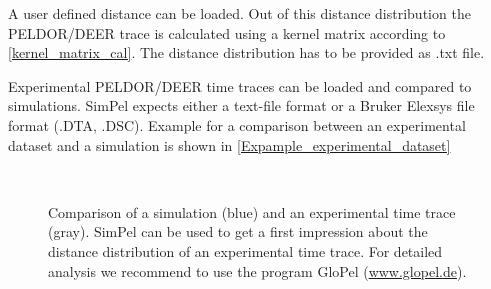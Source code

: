 \documentclass[pdftex,bezier,german,a4,twoside, headexclude,12pt,nochapterprefix, titlepage]{extarticle}
\newcommand{\simpel}{\textsf{SimPel} }
\newcommand{\figspace}{\hspace{0.5cm}}
\begin{document}
A user defined distance can be loaded. Out of this distance distribution the PELDOR/DEER trace is calculated using a kernel matrix according to
\autoref{kernel_matrix_cal}. The distance distribution has to be provided as .txt file.

Experimental PELDOR/DEER time traces can be loaded and compared to simulations. \simpel expects either a text-file format
or a Bruker Elexsys file format (.DTA, .DSC). Example for a comparison between an experimental dataset and a simulation is shown in
\autoref{Expample_experimental_dataset}

\begin{figure}[!htb]
\centering
     \figspace
      \\[-0.3cm]
    \caption{Comparison of a simulation (blue) and an experimental time trace (gray). \simpel can be used to get a first impression about the distance distribution of an experimental time trace. For detailed analysis we recommend to use the program GloPel (\url{www.glopel.de}).
    }
\label{Expample_experimental_dataset}
\end{figure} 
\FloatBarrier
\newpage
\end{document}
